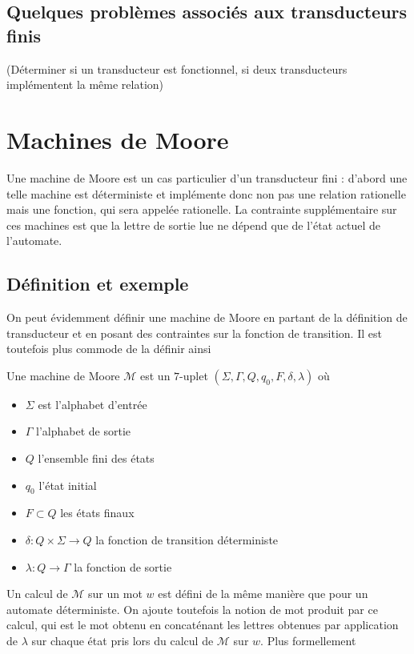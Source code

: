 \documentclass{scrartcl}
\begin{document}
\begin{flushleft}
\subsection{Quelques problèmes associés aux transducteurs finis}

(Déterminer si un transducteur est fonctionnel, si deux transducteurs implémentent la même relation)

\section{Machines de Moore}

Une machine de Moore est un cas particulier d'un transducteur fini : d'abord une telle machine est déterministe
et implémente donc non pas une relation rationelle mais une fonction, qui sera appelée rationelle. La contrainte
supplémentaire sur ces machines est que la lettre de sortie lue ne dépend que de l'état actuel de l'automate.

\subsection{Définition et exemple}

On peut évidemment définir une machine de Moore en partant de la définition de transducteur et en posant des
contraintes sur la fonction de transition. Il est toutefois plus commode de la définir ainsi

\begin{define}
    Une machine de Moore $\mathcal{M}$ est un $7$-uplet $(\Sigma, \Gamma, Q, q_0, F, \delta, \lambda)$ où
    \begin{itemize}
        \item $\Sigma$ est l'alphabet d'entrée
        \item $\Gamma$ l'alphabet de sortie
        \item $Q$ l'ensemble fini des états
        \item $q_0$ l'état initial
        \item $F \subset Q$ les états finaux
        \item $\delta : Q \times \Sigma \rightarrow Q$ la fonction de transition déterministe
        \item $\lambda : Q \rightarrow \Gamma$ la fonction de sortie
    \end{itemize}
\end{define}

Un calcul de $\mathcal{M}$ sur un mot $w$ est défini de la même manière que pour un automate déterministe. On ajoute
toutefois la notion de mot produit par ce calcul, qui est le mot obtenu en concaténant les lettres obtenues
par application de $\lambda$ sur chaque état pris lors du calcul de $\mathcal{M}$ sur $w$. Plus formellement


\end{flushleft}
\end{document}

